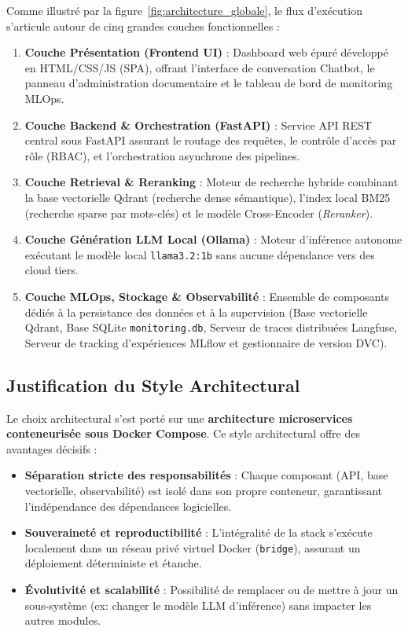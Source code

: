 Comme illustré par la figure~\ref{fig:architecture_globale}, le flux d'exécution s'articule autour de cinq grandes couches fonctionnelles :
\begin{enumerate}
    \item \textbf{Couche Présentation (Frontend UI)} : Dashboard web épuré développé en HTML/CSS/JS (SPA), offrant l'interface de conversation Chatbot, le panneau d'administration documentaire et le tableau de bord de monitoring MLOps.
    \item \textbf{Couche Backend \& Orchestration (FastAPI)} : Service API REST central sous FastAPI assurant le routage des requêtes, le contrôle d'accès par rôle (RBAC), et l'orchestration asynchrone des pipelines.
    \item \textbf{Couche Retrieval \& Reranking} : Moteur de recherche hybride combinant la base vectorielle Qdrant (recherche dense sémantique), l'index local BM25 (recherche sparse par mots-clés) et le modèle Cross-Encoder (\textit{Reranker}).
    \item \textbf{Couche Génération LLM Local (Ollama)} : Moteur d'inférence autonome exécutant le modèle local \texttt{llama3.2:1b} sans aucune dépendance vers des cloud tiers.
    \item \textbf{Couche MLOps, Stockage \& Observabilité} : Ensemble de composants dédiés à la persistance des données et à la supervision (Base vectorielle Qdrant, Base SQLite \texttt{monitoring.db}, Serveur de traces distribuées Langfuse, Serveur de tracking d'expériences MLflow et gestionnaire de version DVC).
\end{enumerate}

\subsection{Justification du Style Architectural}
Le choix architectural s'est porté sur une \textbf{architecture microservices conteneurisée sous Docker Compose}. Ce style architectural offre des avantages décisifs :
\begin{itemize}
    \item \textbf{Séparation stricte des responsabilités} : Chaque composant (API, base vectorielle, observabilité) est isolé dans son propre conteneur, garantissant l'indépendance des dépendances logicielles.
    \item \textbf{Souveraineté et reproductibilité} : L'intégralité de la stack s'exécute localement dans un réseau privé virtuel Docker (\texttt{bridge}), assurant un déploiement déterministe et étanche.
    \item \textbf{Évolutivité et scalabilité} : Possibilité de remplacer ou de mettre à jour un sous-système (ex: changer le modèle LLM d'inférence) sans impacter les autres modules.
\end{itemize}

